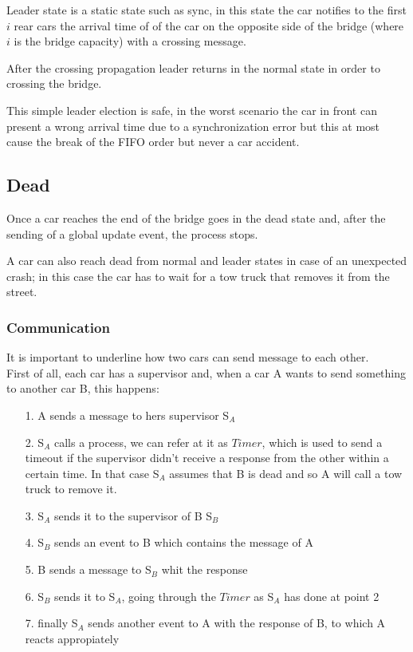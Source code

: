 Leader state is a static state such as sync, in this state the car notifies to 
the first $i$ rear cars the arrival time of of the car on the opposite side of the bridge 
(where $i$ is the bridge capacity) with a crossing message.

After the crossing propagation leader returns in the normal state in order to 
crossing the bridge. 

This simple leader election is safe, in the worst scenario 
the car in front can present a wrong arrival time due to a synchronization error 
but this at most cause the break of the FIFO order but never a car accident.


\subsection{Dead}

Once a car reaches the end of the bridge goes in the dead state and, 
after the sending of a global update event, the process stops.

A car can also reach dead from normal and leader states in case of an unexpected 
crash; in this case the car has to wait for a tow truck that removes it from the 
street. 

\subsubsection{Communication}

It is important to underline how two cars can send message to each other. \\
First of all, each car has a supervisor and, when a car A wants to send something to another car B,
this happens:
\begin{itemize}
   \item[1.] A sends a message to hers supervisor S$_{A}$
   \item [2.] S$_{A}$ calls a process, we can refer at it as $Timer$, which is used to send a timeout
   if the supervisor didn't receive a response from the other within a certain time. In that case S$_{A}$ assumes 
   that B is dead and so A will call a tow truck to remove it.
   \item[3.] S$_{A}$ sends it to the supervisor of B S$_{B}$
   \item [4.] S$_{B}$ sends an event to B which contains the message of A
   \item [5.] B sends a message to S$_{B}$ whit the response
   \item [6.] S$_{B}$ sends it to S$_{A}$, going through the $Timer$ as S$_{A}$ has done at point 2
   \item [7.] finally S$_{A}$ sends another event to A with the response of B, to which A reacts appropiately
\end{itemize}

